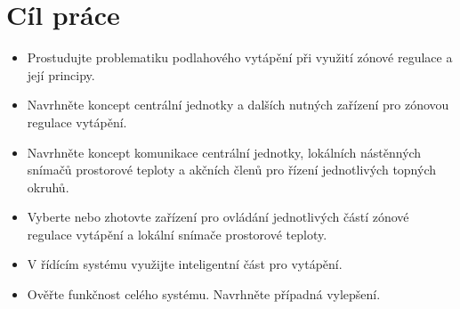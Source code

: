 \section{Cíl práce}
\begin{itemize}
\item Prostudujte problematiku podlahového vytápění při využití zónové regulace a její principy.
\item Navrhněte koncept centrální jednotky a dalších nutných zařízení pro zónovou regulace vytápění.
\item Navrhněte koncept komunikace centrální jednotky, lokálních nástěnných snímačů prostorové teploty a akčních členů pro řízení jednotlivých topných okruhů.
\item Vyberte nebo zhotovte zařízení pro ovládání jednotlivých částí zónové regulace vytápění a lokální snímače prostorové teploty.
\item V řídícím systému využijte inteligentní část pro vytápění.
\item Ověřte funkčnost celého systému. Navrhněte případná vylepšení.

\end{itemize}